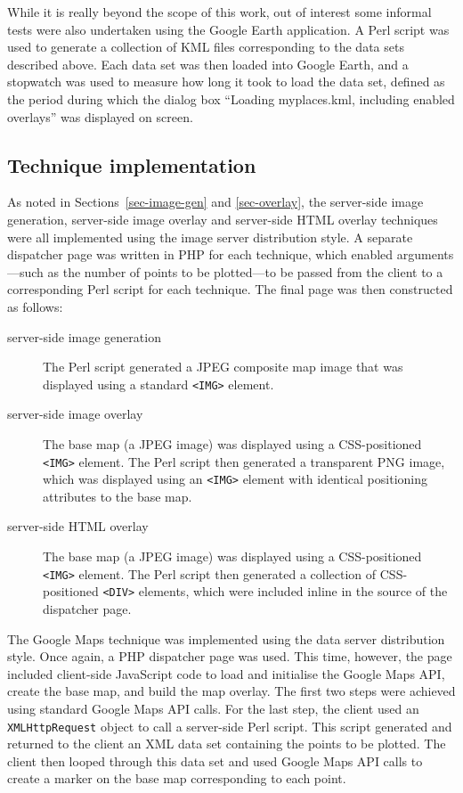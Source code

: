 \documentclass[acmtocl,acmnow]{acmtrans2m}
\begin{document}
While it is really beyond the scope of this work, out of interest some
informal tests were also undertaken using the Google Earth application.
A Perl script was used to generate a collection of KML files
corresponding to the data sets described above. Each data set was then
loaded into Google Earth, and a stopwatch was used to measure how long
it took to load the data set, defined as the period during which the
dialog box ``\textsf{Loading myplaces.kml, including enabled overlays}''
was displayed on screen.


\subsection{Technique implementation}

As noted in Sections~\ref{sec-image-gen} and \ref{sec-overlay}, the
server-side image generation, server-side image overlay and server-side
HTML overlay techniques were all implemented using the image server
distribution style. A separate dispatcher page was written in PHP for
each technique, which enabled arguments---such as the number of points
to be plotted---to be passed from the client to a corresponding Perl
script for each technique. The final page was then constructed as
follows:
\begin{description}

	\item[server-side image generation] The Perl script generated a JPEG
	composite map image that was displayed using a standard \verb|<IMG>|
	element.

	\item[server-side image overlay] The base map (a JPEG image) was
	displayed using a CSS-positioned \verb|<IMG>| element. The Perl
	script then generated a transparent PNG image, which was displayed
	using an \verb|<IMG>| element with identical positioning attributes
	to the base map.

	\item[server-side HTML overlay] The base map (a JPEG image) was
	displayed using a CSS-positioned \verb|<IMG>| element. The Perl
	script then generated a collection of CSS-positioned \verb|<DIV>|
	elements, which were included inline in the source of the dispatcher
	page.

\end{description}

The Google Maps technique was implemented using the data server
distribution style. Once again, a PHP dispatcher page was used. This
time, however, the page included client-side JavaScript code to load and
initialise the Google Maps API, create the base map, and build the map
overlay. The first two steps were achieved using standard Google Maps
API calls. For the last step, the client used an \texttt{XMLHttpRequest}
object to call a server-side Perl script. This script generated and
returned to the client an XML data set containing the points to be
plotted. The client then looped through this data set and used Google
Maps API calls to create a marker on the base map corresponding to each
point.
\end{document}
